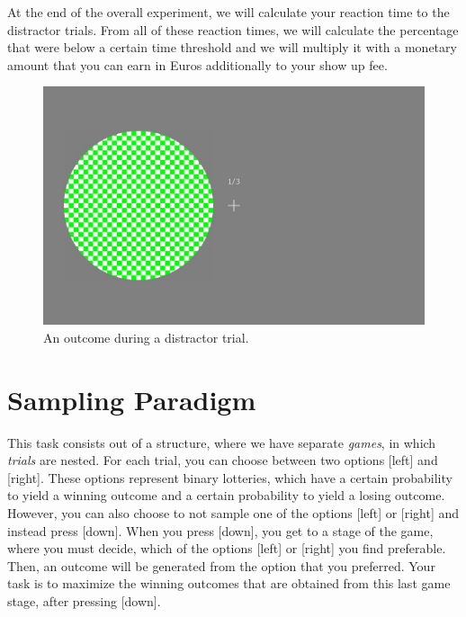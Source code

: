 \documentclass[12pt, oneside]{scrartcl}
\begin{document}
At the end of the overall experiment, we will calculate your reaction time to the distractor trials. From all of these reaction times, we will calculate the percentage that were below a certain time threshold and we will multiply it with a monetary amount that you can earn in Euros additionally to your show up fee. \\


\begin{figure}[h!]
\begin{center}
\includegraphics[scale=0.3]{distr_left.jpg}
\caption{An outcome during a distractor trial.}
\label{distr_left}
\end{center}
\end{figure}



\pagebreak
\section{Sampling Paradigm}

This task consists out of a structure, where we have separate \textit{games}, in which \textit{trials} are nested. For each trial, you can choose between two options [left] and [right]. These options represent binary lotteries, which have a certain probability to yield a winning outcome and a certain probability to yield a losing outcome. \\

However, you can also choose to not sample one of the options [left] or [right] and instead press [down]. When you press [down], you get to a stage of the game, where you must decide, which of the options [left] or [right] you find preferable. Then, an outcome will be generated from the option that you preferred. Your task is to maximize the winning outcomes that are obtained from this last game stage, after pressing [down]. \\
\end{document}

